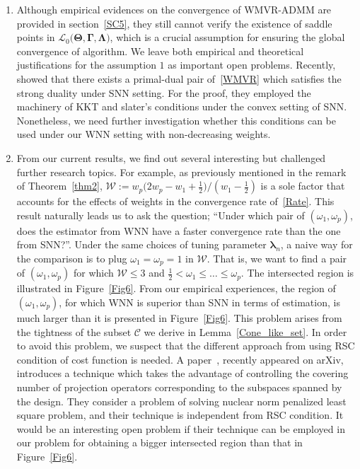 \documentclass[alpha-refs]{wiley-article}
\begin{document}
\begin{enumerate}
    \item Although empirical evidences on the convergence of WMVR-ADMM are provided in section~\ref{SC5}, they still cannot verify the existence of saddle points in $\mathcal{L}_{0}\big(\boldsymbol{\Theta},\boldsymbol{\Gamma},\boldsymbol{\Lambda}\big)$, which is a crucial assumption for ensuring the global convergence of algorithm.
    We leave both empirical and theoretical justifications for the assumption $1$ as important open problems.
    Recently,~\citet{shang2021regularization} showed that there exists a primal-dual pair of~\eqref{WMVR} which satisfies the strong duality under SNN setting.
    For the proof, they employed the machinery of KKT and slater's conditions under the convex setting of SNN.
    Nonetheless, we need further investigation whether this conditions can be used under our WNN setting with non-decreasing weights.

    \item From our current results, we find out several interesting but challenged further research topics.
    For example, as previously mentioned in the remark of Theorem~\ref{thm2}, $\mathcal{W}:= w_{p}\big(2w_{p}-w_{1}+\frac{1}{2}\big)/(w_{1}-\frac{1}{2})$ is a sole factor that accounts for the effects of weights in the convergence rate of~\eqref{Rate}.
    This result naturally leads us to ask the question; ``Under which pair of $(\omega_{1},\omega_{p})$, does the estimator from WNN have a faster convergence rate than the one from SNN?''.
    Under the same choices of tuning parameter $\boldsymbol{\lambda}_{n}$, a naive way for the comparison is to plug $\omega_{1}=\omega_{p}=1$ in $\mathcal{W}$.
    That is, we want to find a pair of $(\omega_{1},\omega_{p})$ for which $\mathcal{W} \leq 3$ and $\frac{1}{2} < \omega_{1} \leq \dots \leq \omega_{p}$.
    The intersected region is illustrated in Figure~\ref{Fig6}.
    From our empirical experiences, the region of $(\omega_{1},\omega_{p})$, for which WNN is superior than SNN in terms of estimation, is much larger than it is presented in Figure~\ref{Fig6}.
    This problem arises from the tightness of the subset $\mathcal{C}$ we derive in Lemma~\ref{Cone_like_set}.
    In order to avoid this problem, we suspect that the different approach from using RSC condition of cost function is needed.
    A paper~\citet{law2021rank}, recently appeared on arXiv, introduces a technique which takes the advantage of controlling the covering number of projection operators corresponding to the subspaces spanned by the design.
    They consider a problem of solving nuclear norm penalized least square problem, and their technique is independent from RSC condition.
    It would be an interesting open problem if their technique can be employed in our problem for obtaining a bigger intersected region than that in Figure~\ref{Fig6}.
\end{enumerate}
\end{document}
